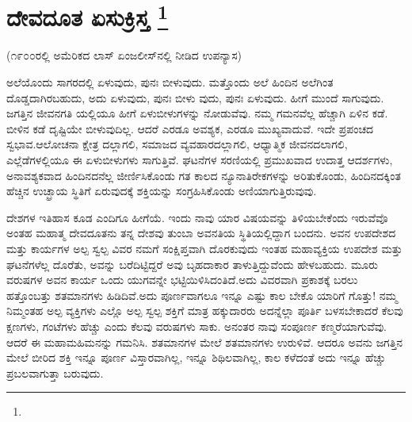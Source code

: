 
\chapter[ದೇವದೂತ ಏಸುಕ್ರಿಸ್ತ ]{ದೇವದೂತ ಏಸುಕ್ರಿಸ್ತ \protect\footnote{}}

(೧೯೦೦ರಲ್ಲಿ ಅಮೆರಿಕದ ಲಾಸ್​ ಏಂಜಲೀಸ್​ನಲ್ಲಿ ನೀಡಿದ ಉಪನ್ಯಾಸ)

ಅಲೆಯೊಂದು ಸಾಗರದಲ್ಲಿ ಏಳುವುದು, ಪುನಃ ಬೀಳುವುದು. ಮತ್ತೊಂದು ಅಲೆ ಹಿಂದಿನ ಅಲೆಗಿಂತ ದೊಡ್ಡದಾಗಿರಬಹುದು, ಅದು ಏಳುವುದು, ಪುನಃ ಬೀಳು ವುದು, ಪುನಃ ಏಳುವುದು. ಹೀಗೆ ಮುಂದೆ ಸಾಗುವುದು. ಜಗತ್ತಿನ ಜೀವನಗತಿ ಯಲ್ಲಿಯೂ ಹೀಗೆ ಏಳುಬೀಳುಗಳನ್ನು ನೋಡುವೆವು. ನಮ್ಮ ಗಮನವೆಲ್ಲ ಹೆಚ್ಚಾಗಿ ಏಳಿನ ಕಡೆ. ಬೀಳಿನ ಕಡೆ ದೃಷ್ಟಿಯೇ ಬೀಳುವುದಿಲ್ಲ. ಆದರೆ ಎರಡೂ ಅವಶ್ಯಕ, ಎರಡೂ ಮುಖ್ಯವಾದುವೆ. ಇದೇ ಪ್ರಪಂಚದ ಸ್ವಭಾವ.ಆಲೋಚನಾ ಕ್ಷೇತ್ರ ದಲ್ಲಾಗಲಿ, ಸಮಾಜದ ವ್ಯವಹಾರದಲ್ಲಾಗಲಿ, ಆಧ್ಯಾತ್ಮಿಕ ಜೀವನದಲಾಗಲಿ, ಎಲ್ಲೆಡೆಗಳಲ್ಲಿಯೂ ಈ ಏಳುಬೀಳುಗಳು ಸಾಗುತ್ತಿವೆ. ಘಟನೆಗಳ ಸರಣಿಯಲ್ಲಿ ಪ್ರಮುಖವಾದ ಉದಾತ್ತ ಆದರ್ಶಗಳು, ಅನಾವಶ್ಯಕವಾದ ಹಿಂದಿನದನೆಲ್ಲ ಜೀರ್ಣಿಸಿಕೊಂಡು ಗತ ಕಾಲದ ನ್ಯೂನಾತಿರೇಕಗಳನ್ನು ಅರಿತುಕೊಂಡು, ಹಿಂದಿನದಕ್ಕಿಂತ ಹೆಚ್ಚಿನ ಉಚ್ಛ್ರಾಯ ಸ್ಥಿತಿಗೆ ಏರುವುದಕ್ಕೆ ಶಕ್ತಿಯನ್ನು ಸಂಗ್ರಹಿಸಿಕೊಂಡು ಅಣಿಯಾಗುತ್ತಿರುವುವು.

ದೇಶಗಳ ಇತಿಹಾಸ ಕೂಡ ಎಂದಿಗೂ ಹೀಗೆಯೆ. ಇಂದು ನಾವು ಯಾರ ವಿಷಯವನ್ನು ತಿಳಿಯಬೇಕೆಂದು ಇರುವೆವೊ ಅಂತಹ ಮಹಾತ್ಮ ದೇವದೂತನು ತನ್ನ ದೇಶವು ತುಂಬಾ ಅವನತಿಯ ಸ್ಥಿತಿಯಲ್ಲಿದ್ದಾಗ ಬಂದನು. ಅವನ ಉಪದೇಶದ ಮತ್ತು ಕಾರ್ಯಗಳ ಅಲ್ಪ ಸ್ವಲ್ಪ ವಿವರ ನಮಗೆ ಸಂಕ್ಷಿಪ್ತವಾಗಿ ದೊರಕುವುದು ಇಂತಹ ಮಹಾವ್ಯಕ್ತಿಯ ಉಪದೇಶ ಮತ್ತು ಘಟನೆಗಳೆಲ್ಲ ದೊರೆತು, ಅವನ್ನು ಬರೆದಿಟ್ಟಿದ್ದರೆ ಅವು ಬೃಹದಾಕಾರ ತಾಳುತ್ತಿದ್ದುವೆಂದು ಹೇಳಬಹುದು. ಮೂರು ವರುಷಗಳ ಅವನ ಕಾರ್ಯ ಒಂದು ಯುಗವನ್ನೇ ಭಟ್ಟಿಯಿಳಿಸಿದಂತಿದೆ.ಅದು ವಿವರವಾಗಿ ಪ್ರಕಾಶಕ್ಕೆ ಬರಲು ಹತ್ತೊಂಬತ್ತು ಶತಮಾನಗಳು ಹಿಡಿದಿವೆ.ಅದು ಪೂರ್ಣವಾಗಲೂ ಇನ್ನೂ ಎಷ್ಟು ಕಾಲ ಬೇಕೊ ಯಾರಿಗೆ ಗೊತ್ತು! ನಮ್ಮ ನಿಮ್ಮಂತಹ ಅಲ್ಪ ವ್ಯಕ್ತಿಗಳು ಎಲ್ಲೊ ಅಲ್ಪ ಸ್ವಲ್ಪ ಶಕ್ತಿಗೆ ಮಾತ್ರ ಹಕ್ಕುದಾರರು ಅದನ್ನೆಲ್ಲಾ ಪೂರ್ತಿ ಬಳಸಬೇಕಾದರೆ ಕೆಲವು ಕ್ಷಣಗಳು, ಗಂಟೆಗಳು ಹೆಚ್ಚು ಎಂದು ಕೆಲವು ವರುಷಗಳು ಸಾಕು. ಅನಂತರ ನಾವು ಸಂಪೂರ್ಣ ಕಣ್ಮರೆಯಾಗುವೆವು. ಆದರೆ ಈ ಮಹಾಮಹಿಮನನ್ನು ಗಮನಿಸಿ. ಶತಮಾನಗಳ ಮೇಲೆ ಶತಮಾನಗಳು ಉರುಳಿವೆ. ಆದರೂ ಅವನು ಜಗತ್ತಿನ ಮೇಲೆ ಬೀರಿದ ಶಕ್ತಿ ಇನ್ನೂ ಪೂರ್ಣ ವಿಸ್ತಾರವಾಗಿಲ್ಲ, ಇನ್ನೂ ಶಿಥಿಲವಾಗಿಲ್ಲ, ಕಾಲ ಕಳೆದಂತೆ ಅದು ಇನ್ನೂ ಹೆಚ್ಚು ಪ್ರಬಲವಾಗುತ್ತಾ ಬರುವುದು.

